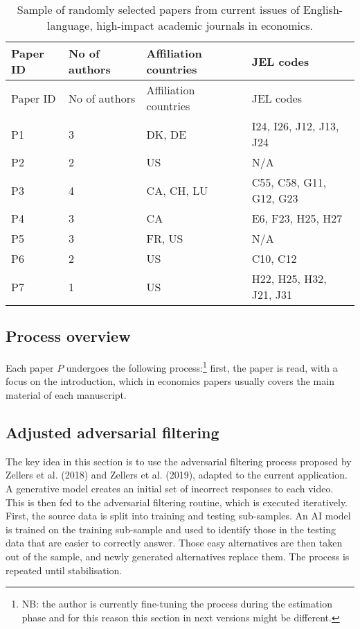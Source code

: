 \documentclass[
]{article}
\begin{document}
\begin{longtable}[]{@{}llll@{}}
\caption{Sample of randomly selected papers from current issues of
English-language, high-impact academic journals in
economics.}\label{tbl-papers}\tabularnewline
\toprule\noalign{}
Paper ID & No of authors & Affiliation countries & JEL codes \\
\midrule\noalign{}
\endfirsthead
\toprule\noalign{}
Paper ID & No of authors & Affiliation countries & JEL codes \\
\midrule\noalign{}
\endhead
\bottomrule\noalign{}
\endlastfoot
P1 & 3 & DK, DE & I24, I26, J12, J13, J24 \\
P2 & 2 & US & N/A \\
P3 & 4 & CA, CH, LU & C55, C58, G11, G12, G23 \\
P4 & 3 & CA & E6, F23, H25, H27 \\
P5 & 3 & FR, US & N/A \\
P6 & 2 & US & C10, C12 \\
P7 & 1 & US & H22, H25, H32, J21, J31 \\
\end{longtable}

\subsection{Process overview}\label{process-overview}

Each paper \(P\) undergoes the following process:\footnote{NB: the
  author is currently fine-tuning the process during the estimation
  phase and for this reason this section in next versions might be
  different.} first, the paper is read, with a focus on the
introduction, which in economics papers usually covers the main material
of each manuscript.

\subsection{Adjusted adversarial
filtering}\label{adjusted-adversarial-filtering}

The key idea in this section is to use the adversarial filtering process
proposed by Zellers et al. (2018) and Zellers et al. (2019), adapted to
the current application. A generative model creates an initial set of
incorrect responses to each video. This is then fed to the adversarial
filtering routine, which is executed iteratively. First, the source data
is split into training and testing sub-samples. An AI model is trained
on the training sub-sample and used to identify those in the testing
data that are easier to correctly answer. Those easy alternatives are
then taken out of the sample, and newly generated alternatives replace
them. The process is repeated until stabilisation.
\end{document}
